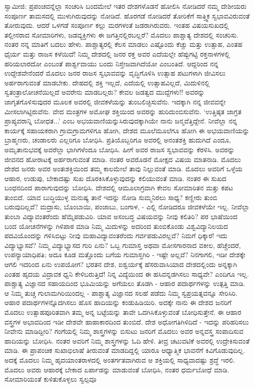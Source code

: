 ಸ್ವಾಮೀಜಿ: ಪ್ರಪಂಚವನ್ನೆಲ್ಲಾ ಸಂಚರಿಸಿ ಬಂದಮೇಲೆ ಇತರ ದೇಶಗಳೊಡನೆ ಹೋಲಿಸಿ ನೋಡಿದರೆ ನಮ್ಮ ದೇಶೀಯರು ಸಂಪೂರ್ಣ ತಾಮಸದಲ್ಲಿ ಮುಳುಗಿರುವುದನ್ನು ನೋಡಿದೆ. ಹೊರಗಡೆ ನೋಡಿದರೆ ತೋರಿಕೆಗೆ ಸಾತ್ತ್ವಿಕ ಸ್ವಭಾವವಿರುವಂತೆ ತೋರುವುದು. ಆದರೆ ಒಳಗಡೆ ಸಂಪೂರ್ಣ ಕಲ್ಲು ಮರಗಳಂತೆ ಜಡರಾಗಿರುವರು. ಇಂತಹ ವಿಷಯಸುಖದಲ್ಲಿ ತಲ್ಲೀನರಾದ ಸೋಮಾರಿಗಳು, ಜಡವ್ಯಕ್ತಿಗಳು ಈ ಜಗತ್ತಿನಲ್ಲಿರಬಲ್ಲರೆ? ಮೊದಲು ಪಾಶ್ಚಾತ್ಯ ದೇಶದಲ್ಲಿ ಸಂಚರಿಸು. ನಂತರ ನನ್ನ ಮಾತಿಗೆ ಬದಲು ಹೇಳು. ಪಾಶ್ಚಾತ್ಯರಲ್ಲಿ ಕೆಲಸ ಮಾಡಲು ಎಷ್ಟೊಂದು ಕೆಚ್ಚು ಮತ್ತು ಉತ್ಸಾಹ, ಎಂತಹ ಧೈರ್ಯ ಮತ್ತು ರಾಜಸ ಕಳೆಯಿದೆ! ನಿಮ್ಮ ದೇಶದಲ್ಲಿ ಜನರ ರಕ್ತ ಅವರ ಎದೆಯಲ್ಲೇ ಹೆಪ್ಪುಗಟ್ಟಿ ರಕ್ತನಾಳಗಳಲ್ಲಿ ಹರಿಯಲಾರದೋ ಎಂಬಂತೆ ಪಾರ್ಶ್ವವಾಯು ಬಂದು ನಿಸ್ತೇಜವಾಗಿದೆಯೋ ಎಂಬಂತಿದೆ. ಆದ್ದರಿಂದ ನನ್ನ ಉದ್ದೇಶವೇನೆಂದರೆ ಮೊದಲು ಜನರ ರಾಜಸ ಸ್ವಭಾವವನ್ನು ವೃದ್ಧಿಗೊಳಿಸಿ ಉತ್ಸಾಹ ಪಟುಗಳಾಗಿ ಜೀವಿಸಲು ಅರ್ಹರಾಗುವಂತೆ ಮಾಡಬೇಕು. ದೇಹದಲ್ಲಿ ಶಕ್ತಿ ಇಲ್ಲದೆ, ಎದೆಯಲ್ಲಿ ಉತ್ಸಾಹವಿಲ್ಲದೆ, ಮಿದುಳಿನಲ್ಲಿ ಸ್ವತಂತ್ರಾಲೋಚನೆಯಿಲ್ಲದೆ ಅವರೇನು ಮಾಡಬಲ್ಲರು? ಕೇವಲ ಜಡತ್ವದ ಮುದ್ದೆಗಳು!! ಅವರನ್ನು ಜಾಗೃತಗೊಳಿಸುವುದರ ಮೂಲಕ ಅವರಲ್ಲಿ ಜೀವಕಳೆಯನ್ನು ತುಂಬಲಿಚ್ಛಿಸುವೆನು. ಇದಕ್ಕಾಗಿ ನನ್ನ ಜೀವವನ್ನೇ ಮೀಸಲಾಗಿಟ್ಟಿರುವೆನು. ವೇದ ಮಂತ್ರಗಳ ಅಮೋಘ ಶಕ್ತಿಯಿಂದ ಅವರನ್ನು ಹುರಿದುಂಬಿಸುವೆನು. ‘ಉತ್ತಿಷ್ಠತ ಜಾಗ್ರತ ಪ್ರಾಪ್ಯವರಾನ್ನಿ ಬೋಧತ...’ ಎಂಬ ಅಭಯವಾಣಿಯನ್ನುಸಿರುವುದಕ್ಕಾಗಿಯೇ ನಾನು ಜನ್ಮವೆತ್ತಿದ್ದೇನೆ. ನೀವೆಲ್ಲಾ ನನ್ನ ಕಾರ್ಯಕ್ಕೆ ಸಹಾಯಕರಾಗಿ ಗ್ರಾಮಗ್ರಾಮಗಳಿಗೂ ಹೋಗಿ, ದೇಶದ ಮೂಲೆಮೂಲೆಗೂ ಹೋಗಿ ಈ ಅಭಯವಾಣಿಯನ್ನು ಬ್ರಾಹ್ಮಣರು, ಚಂಡಾಲರು ಎಲ್ಲರಿಗೂ ಬೋಧಿಸಿ. ಪ್ರತಿಯೊಬ್ಬರಿಗೂ ಅವರಲ್ಲಿ ಅನಂತಶಕ್ತಿ ಹುದುಗಿದೆ ಎಂದೂ, ಅಮೃತಾನುಭವಕ್ಕೆ ಅವರೆಲ್ಲಾ ಭಾಗಿಗಳೆಂದೂ ಬೋಧಿಸಿ. ಹೀಗೆ ಅವರ ರಾಜಸ ಸ್ವಭಾವವನ್ನು ಕೆರಳಿಸಿ. ಅವರನ್ನು ಜೀವನದ ಹೋರಾಟಕ್ಕೆ ಅರ್ಹರಾಗುವಂತೆ ಮಾಡಿ. ನಂತರ ಅವರೊಡನೆ ಮೋಕ್ಷದ ವಿಷಯ ಮಾತನಾಡಿ. ಮೊದಲು ದೇಶದ ಜನರು ಅವರ ಅಂತಃಶಕ್ತಿಯಿಂದ ತಮ್ಮ ಕಾಲಮೇಲೆ ತಾವು ನಿಲ್ಲುವಂತೆ ಮಾಡಿ. ಮೊದಲು ಅವರಿಗೆ ಒಳ್ಳೆಯ ಆಹಾರ, ಉಡುಪು, ಬೇಕಾದಷ್ಟು ಸುಖ ದೊರಕಿಸಿಕೊಳ್ಳುವುದನ್ನು ಕಲಿಯುವಂತೆ ಮಾಡಿ. ನಂತರ ಈ ಸುಖದ ಬಂಧನದಿಂದ ಪಾರಾಗುವುದನ್ನು ಬೋಧಿಸಿ. ದೇಶದಲ್ಲಿ ಆಮೂಲಾಗ್ರವಾಗಿ ಕೇವಲ ಸೋಮಾರಿತನ ಮತ್ತು ಕಪಟ ತುಂಬಿದೆ. ಯಾವ ಬುದ್ಧಿಯುಳ್ಳ ಮನುಷ್ಯ ತಾನೆ ಇದನ್ನು ನೋಡಿ ಸುಮ್ಮನಿರಲು ಸಾಧ್ಯ? ಕಣ್ಣೀರು ತುಂಬಿ ಬರುವುದಿಲ್ಲವೆ? ಮದ್ರಾಸು, ಬೊಂಬಾಯಿ, ಪಂಜಾಬು, ಬಂಗಾಳ, - ಎಲ್ಲಿ ನೋಡಿದರೂ ಜೀವಕಳೆಯೇ ಇಲ್ಲ. ನೀವೆಲ್ಲಾ ತುಂಬಾ ವಿದ್ಯಾವಂತರೆಂದು ಹೆಮ್ಮೆಪಡುವಿರಿ. ಯಾವ ಅಸಂಬದ್ಧ ವಿಷಯವನ್ನು ನೀವು ಕಲಿತಿರಿ? ಪರ ಭಾಷೆಯಿಂದ ಬಂದ ಯೋಚನೆಗಳನ್ನು ಗಿಳಿಪಾಠ ಮಾಡಿ ನಿಮ್ಮ ಮಿದುಳನ್ನು ಅದರಿಂದ ತುಂಬಿಕೊಂಡು ವಿಶ್ವವಿದ್ಯಾನಿಲಯದ ಪದವಿಯೊಂದನ್ನು ಗಳಿಸಿಬಿಟ್ಟು ನೀವು ಮಹಾವಿದ್ಯಾವಂತರೆಂದು ಗರ್ವಪಡುವಿರಲ್ಲವೆ? ನಿಮಗೆ ಧಿಕ್ಕಾರ! ಇದು ವಿದ್ಯಾಭ್ಯಾಸವೆ? ನಿಮ್ಮ ವಿದ್ಯಾಭ್ಯಾಸದ ಗುರಿ ಏನು? ಒಬ್ಬ ಗುಮಾಸ್ತ ಅಥವಾ ಮೋಸಗಾರನಾದ ವಕೀಲ, ಹೆಚ್ಚೆಂದರೆ, ಉಪನ್ಯಾಯಾಧಿಪತಿ; ಅದೂ ಕೂಡ ಮತ್ತೊಂದು ಬಗೆಯ ಗುಮಾಸ್ತಗಿರಿ - ಇಷ್ಟೇ ಅಲ್ಲವೆ? ನಿನಗಾಗಲಿ, ಇಡೀ ದೇಶಕ್ಕೇ ಆಗಲಿ ಇದರಿಂದ ಏನು ಉಪಯೋಗ? ಭರತನ ದೇಶ, ಐಶ್ವರ್ಯಕ್ಕೆ ಹೆಸರುವಾಸಿಯಾದ ದೇಶದಲ್ಲಿಂದು ಅನ್ನಕ್ಕಾಗಿ ಎಂತಹ ಹೃದಯ ವಿದ್ರಾವಕ ಧ್ವನಿ ಕೇಳಿಬರುತ್ತಿದೆ! ನಿನ್ನ ವಿದ್ಯೆಯಿಂದ ಈ ಹಸಿವನ್ನಡಗಿಸಲು ಸಾಧ್ಯವೇ? ಎಂದಿಗೂ ಇಲ್ಲ. ಪಾಶ್ಚಾತ್ಯ ವಿಜ್ಞಾನದ ಸಹಾಯದಿಂದ ಭೂಮಿಯನ್ನು ಅಗೆಯಲು ತೊಡಗಿ - ಆಹಾರ ಪದಾರ್ಥಗಳನ್ನು ಉತ್ಪತ್ತಿ ಮಾಡಿ. ಆ ನಿಮ್ಮ ತುಚ್ಚ ಗುಲಾಮಗಿರಿಯಿಂದಲ್ಲ - ಪಾಶ್ಚಾತ್ಯ ವಿಜ್ಞಾನದ ಸಲಹೆ ಪಡೆದು ನಿಮ್ಮ ಸ್ವಪ್ರಯತ್ನವನ್ನೂ ಸೇರಿಸಿರಿ. ಆಹಾರ ಪದಾರ್ಥಗಳನ್ನೊದಗಿಸಲು ಹೊಸ ಹಾದಿಯನ್ನು ಕಂಡುಹಿಡಿಯಿರಿ. ಅದಕ್ಕೇ ನಾನು ಈ ದೇಶದ ಜನರಿಗೆ ಮೊದಲು ಉತ್ಸಾಹಪೂರಿತವಾಗಿ ತಮ್ಮ ಅನ್ನ ಬಟ್ಟೆಯನ್ನು ತಾವೇ ಒದಗಿಸಿಕೊಳ್ಳುವಂತೆ ಬೋಧಿಸುತ್ತೇನೆ. ಈ ಆಹಾರ ವಸ್ತ್ರಗಳ ಅಭಾವದಿಂದ ಇಡೀ ದೇಶವೇ ಹಾಹಾಕಾರದಿಂದ ತುಂಬಿದೆ. ದೇಶ ಅಧೋಗತಿಗಿಳಿದಿದೆ - ಇದನ್ನು ಪರಿಹರಿಸಲು ನೀವೇನು ಮಾಡಿದ್ದೀರಿ? ಗಂಗೆಯಲ್ಲಿ ನಿಮ್ಮ ಶಾಸ್ತ್ರಗಳನ್ನು ಬಿಸುಟು ಜನರಿಗೆ ಮೊದಲು ಅವರ ಅನ್ನವಸ್ತ್ರ ಸಂಪಾದಿಸುವ ಹಾದಿಯನ್ನು ಬೋಧಿಸಿ. ನಂತರ ಅವರಿಗೆ ನಿಮ್ಮ ಶಾಸ್ತ್ರಗಳನ್ನು ಓದಿ ಹೇಳಿ. ತೀವ್ರ ಚಟುವಟಿಕೆ ಅವರಲ್ಲಿ ಉದ್ರೇಕಿಸುವಂತೆ ಮಾಡಿ. ಈ ಪ್ರಾಪಂಚಿಕ ಸುಖಾಭಿಲಾಷೆ ತೀರುವಂತೆ ಮಾಡದಿದ್ದಲ್ಲಿ ಯಾರೂ ಆಧ್ಯಾತ್ಮಿಕ ಭಾವನೆಗೆ ಕಿವಿಗೊಡುವುದಿಲ್ಲ. ಅದಕ್ಕೆ ಮೊದಲು ನಿಮ್ಮ ಹೃದಯಾಂತರಾಳದಲ್ಲಿ ಅಂತರ್ಗತವಾಗಿರುವ ಆ ಶಕ್ತಿಯಲ್ಲಿ ಸಾಧ್ಯವಾದಷ್ಟು ಶ್ರದ್ಧೆ ಇರಲಿ. ಮೊದಲು ಅವರು ಆಹಾರಕ್ಕೆ ಬೇಕಾದ ಏರ್ಪಾಡನ್ನು ಮಾಡುವಂತೆ ಬೋಧಿಸಿ, ನಂತರ ಧರ್ಮಬೋಧೆ ಮಾಡಿ. ಸೋಮಾರಿಯಂತೆ ಕುಳಿತುಕೊಳ್ಳಲು ಸ್ವಲ್ಪವೂ 
